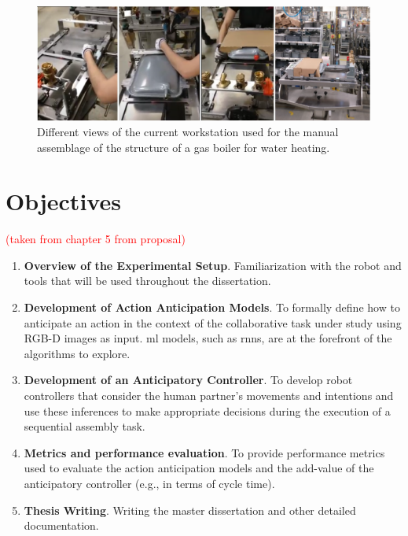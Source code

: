 \begin{figure}[H]
\centerline{\includegraphics[width=6in]{figs/usecase.png}}
\caption{Different views of the current workstation used for the manual assemblage of the structure of a gas boiler for water heating.}
\label{fig:usecase}
\end{figure}

\section{Objectives}

\textcolor{red}{(taken from chapter 5 from proposal)}

\begin{enumerate}
    \item \textbf{Overview of the Experimental Setup}. Familiarization with the robot and tools that will be used throughout the dissertation.

    \item \textbf{Development of Action Anticipation Models}. To formally define how to anticipate an action in the context of the collaborative task under study using RGB-D images as input. \acs{ml} models, such as \acfp{rnn}, are at the forefront of the algorithms to explore.
    
    \item \textbf{Development of an Anticipatory Controller}. To develop robot controllers that consider the human partner's movements and intentions and use these inferences to make appropriate decisions during the execution of a sequential assembly task.

    \item \textbf{Metrics and performance evaluation}. To provide performance metrics used to evaluate the action anticipation models and the add-value of the anticipatory controller (e.g., in terms of cycle time).
    
    \item \textbf{Thesis Writing}. Writing the master dissertation and other detailed documentation.
\end{enumerate}

